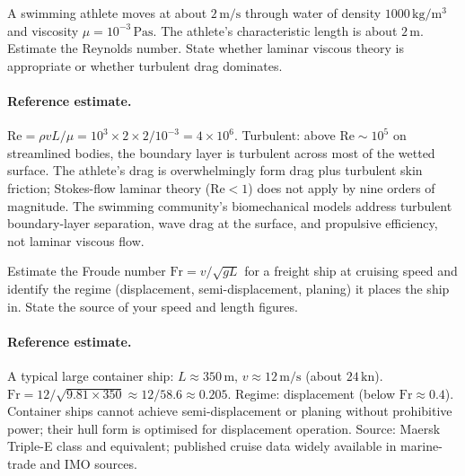 \begin{exercise}
A swimming athlete moves at about $2 \,\si{\meter\per\second}$
through water of density $1000 \,\si{\kilogram\per\meter\cubed}$ and
viscosity $\mu = 10^{-3} \,\si{\pascal\second}$. The athlete's
characteristic length is about $2 \,\si{\meter}$. Estimate the
Reynolds number. State whether laminar viscous theory is appropriate
or whether turbulent drag dominates.

\paragraph{Reference estimate.}
$\mathrm{Re} = \rho v L / \mu = 10^{3} \times 2 \times 2 / 10^{-3}
= 4 \times 10^{6}$. Turbulent: above $\mathrm{Re} \sim 10^{5}$ on
streamlined bodies, the boundary layer is turbulent across most of
the wetted surface. The athlete's drag is overwhelmingly form drag
plus turbulent skin friction; Stokes-flow laminar theory
($\mathrm{Re} < 1$) does not apply by nine orders of magnitude. The
swimming community's biomechanical models address turbulent
boundary-layer separation, wave drag at the surface, and propulsive
efficiency, not laminar viscous flow.
\end{exercise}

\begin{exercise}
Estimate the Froude number $\mathrm{Fr} = v / \sqrt{g L}$ for a
freight ship at cruising speed and identify the regime
(displacement, semi-displacement, planing) it places the ship in.
State the source of your speed and length figures.

\paragraph{Reference estimate.}
A typical large container ship: $L \approx 350 \,\si{\meter}$,
$v \approx 12 \,\si{\meter\per\second}$ (about $24 \,\text{kn}$).
$\mathrm{Fr} = 12 / \sqrt{9.81 \times 350} \approx 12 / 58.6 \approx
0.205$. Regime: displacement (below $\mathrm{Fr} \approx 0.4$).
Container ships cannot achieve semi-displacement or planing without
prohibitive power; their hull form is optimised for displacement
operation. Source: Maersk Triple-E class and equivalent; published
cruise data widely available in marine-trade and IMO sources.
\end{exercise}

